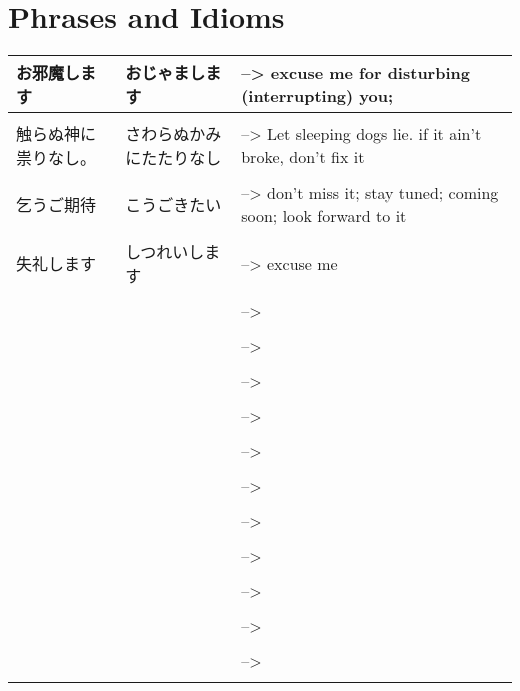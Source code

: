 \documentclass{article}
\begin{document}
\part*{Phrases and Idioms}
\begin{tabular}{ l | l p{10cm} }
お邪魔します        &おじゃまします     &--> excuse me for disturbing (interrupting) you; \\ \hline\\[-1em]
触らぬ神に祟りなし。&さわらぬかみにたたりなし &--> Let sleeping dogs lie. if it ain't broke, don't fix it \\ \hline\\[-1em]
乞うご期待 &こうごきたい &--> don't miss it; stay tuned; coming soon; look forward to it \\ \hline\\[-1em]
 失礼します &しつれいします &--> excuse me \\ \hline\\[-1em]
 & &--> \\ \hline\\[-1em]
 & &--> \\ \hline\\[-1em]
 & &--> \\ \hline\\[-1em]
 & &--> \\ \hline\\[-1em]
 & &--> \\ \hline\\[-1em]
 & &--> \\ \hline\\[-1em]
 & &--> \\ \hline\\[-1em]
 & &--> \\ \hline\\[-1em]
 & &--> \\ \hline\\[-1em]
 & &--> \\ \hline\\[-1em]
 & &--> \\ \hline\\[-1em]
\end{tabular}
\end{document}
